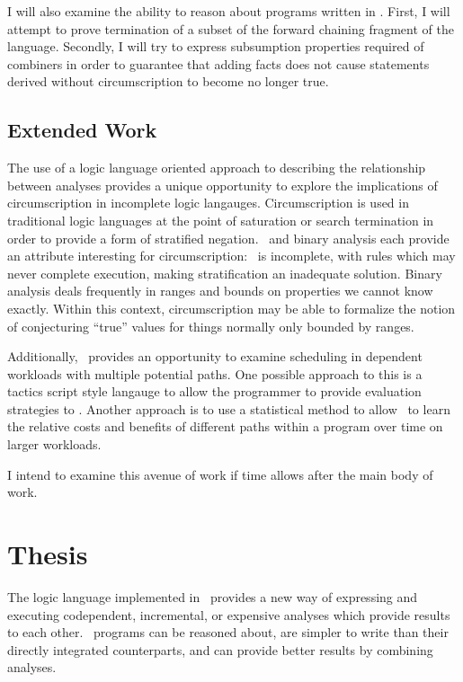 I will also examine the ability to reason about programs written in \sysname.
First, I will attempt to prove termination of a subset of the forward chaining fragment of the language.
Secondly, I will try to express subsumption properties required of combiners in order to guarantee that adding facts does not cause statements derived without circumscription to become no longer true.
\subsection{Extended Work}
The use of a logic language oriented approach to describing the relationship between analyses provides a unique opportunity to explore the implications of circumscription in incomplete logic langauges.
Circumscription is used in traditional logic languages at the point of saturation or search termination in order to provide a form of stratified negation.
\sysname\ and binary analysis each provide an attribute interesting for circumscription:
\sysname\ is incomplete, with rules which may never complete execution, making stratification an inadequate solution.
Binary analysis deals frequently in ranges and bounds on properties we cannot know exactly.
Within this context, circumscription may be able to formalize the notion of conjecturing ``true'' values for things normally only bounded by ranges.

Additionally, \sysname\ provides an opportunity to examine scheduling in dependent workloads with multiple potential paths.
One possible approach to this is a tactics script style langauge to allow the programmer to provide evaluation strategies to \sysname.
Another approach is to use a statistical method to allow \sysname\ to learn the relative costs and benefits of different paths within a program over time on larger workloads.

I intend to examine this avenue of work if time allows after the main body of work.
\section{Thesis}
The logic language implemented in \sysname\ provides a new way of expressing and executing codependent, incremental, or expensive analyses which provide results to each other. \sysname\ programs can be reasoned about, are simpler to write than their directly integrated counterparts, and can provide better results by combining analyses.
